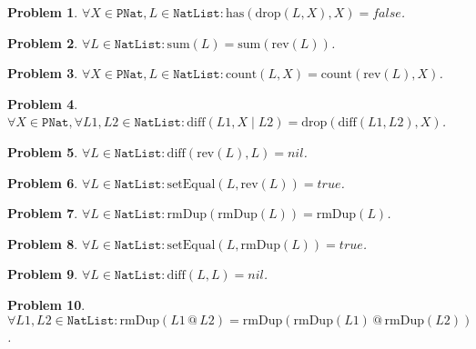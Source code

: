 \documentclass[12pt, a4paper]{article}
\newtheorem{problem}{Problem}
\newcommand{\rel}[1]{\mathrel{#1}}
\newcommand{\rmx}[1]{\mathrm{#1}}
\begin{document}
\begin{problem}
$\forall X \in \mathtt{PNat}, L \in \mathtt{NatList} \colon \rmx{has}(\rmx{drop}(L, X), X) = false$.
\end{problem}

\begin{problem}
$\forall L \in \mathtt{NatList} \colon \rmx{sum}(L) = \rmx{sum}(\rmx{rev}(L))$.
\end{problem}

\begin{problem}
$\forall X \in \mathtt{PNat}, L \in \mathtt{NatList} \colon \rmx{count}(L, X) = \rmx{count}(\rmx{rev}(L), X)$.
\end{problem}

\begin{problem}
$\forall X \in \mathtt{PNat}, \forall L1, L2 \in \mathtt{NatList} \colon \rmx{diff}(L1, X \mid L2) = \rmx{drop}(\rmx{diff}(L1, L2), X)$.
\end{problem}

\begin{problem}
$\forall L \in \mathtt{NatList} \colon \rmx{diff}(\rmx{rev}(L), L) = nil$.
\end{problem}

\begin{problem}
$\forall L \in \mathtt{NatList} \colon \rmx{setEqual}(L, \rmx{rev}(L)) = true$.
\end{problem}

\begin{problem}
$\forall L \in \mathtt{NatList} \colon \rmx{rmDup}(\rmx{rmDup}(L)) = \rmx{rmDup}(L)$.
\end{problem}

\begin{problem}
$\forall L \in \mathtt{NatList} \colon \rmx{setEqual}(L, \rmx{rmDup}(L)) = true$.
\end{problem}

\begin{problem}
$\forall L \in \mathtt{NatList} \colon \rmx{diff}(L, L) = nil$.
\end{problem}

\begin{problem}
$\forall L1, L2 \in \mathtt{NatList} \colon \rmx{rmDup}(L1 \rel{@} L2) = \rmx{rmDup}(\rmx{rmDup}(L1) \rel{@} \rmx{rmDup}(L2))$.
\end{problem}

%
%
\end{document}
